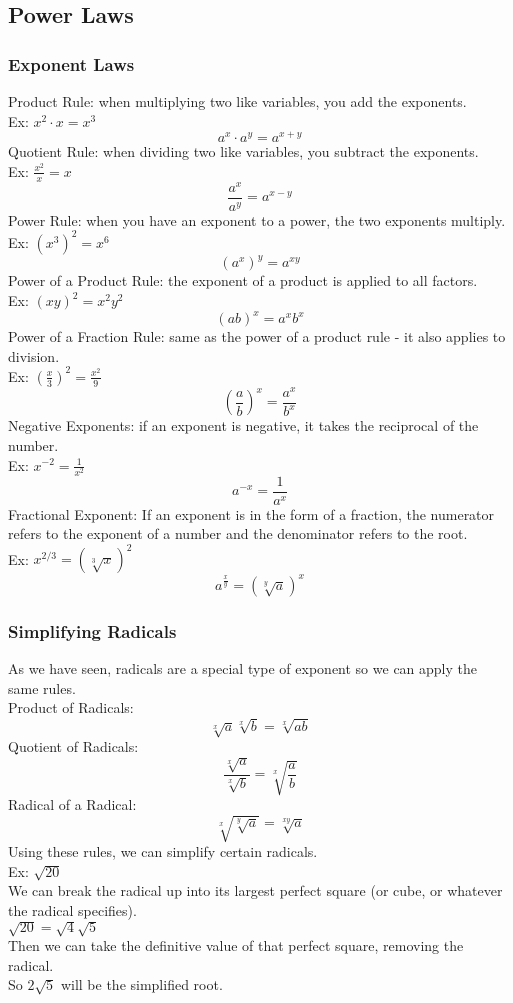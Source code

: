 \subsection{Power Laws}

\subsubsection{Exponent Laws}
Product Rule: when multiplying two like variables, you add the exponents.\\ Ex: $x^2\cdot x=x^3$
$$a^x\cdot a^y=a^{x+y}$$
Quotient Rule: when dividing two like variables, you subtract the exponents.\\
Ex: $\frac{x^2}{x}=x$
$$\frac{a^x}{a^y}=a^{x-y}$$
Power Rule: when you have an exponent to a power, the two exponents multiply.\\
Ex: $(x^3)^2=x^6$
$$(a^x)^y=a^{xy}$$
Power of a Product Rule: the exponent of a product is applied to all factors.\\
Ex: $(xy)^2=x^2y^2$
$$(ab)^x=a^xb^x$$
Power of a Fraction Rule: same as the power of a product rule - it also applies to division.\\
Ex: $\left(\frac{x}{3}\right)^2=\frac{x^2}{9}$
$$\left(\frac{a}{b}\right)^x=\frac{a^x}{b^x}$$
Negative Exponents: if an exponent is negative, it takes the reciprocal of the number.\\
Ex: $x^{-2}=\frac{1}{x^2}$
$$a^{-x}=\frac{1}{a^x}$$
Fractional Exponent: If an exponent is in the form of a fraction, the numerator refers to the exponent of a number and the denominator refers to the root.\\
Ex: $x^{2/3}=(\sqrt[3]{x})^2$
$$a^{\frac{x}{y}}=\left(\sqrt[y]{a}\right)^x$$

\subsubsection{Simplifying Radicals}
As we have seen, radicals are a special type of exponent so we can apply the same rules.\\
Product of Radicals:
$$\sqrt[x]{a}\sqrt[x]{b}=\sqrt[x]{ab}$$
Quotient of Radicals:
$$\frac{\sqrt[x]{a}}{\sqrt[x]{b}}=\sqrt[x]{\frac{a}{b}}$$
Radical of a Radical:
$$\sqrt[x]{\sqrt[y]{a}}=\sqrt[xy]{a}$$
Using these rules, we can simplify certain radicals.\\
Ex: $\sqrt{20}$\\
We can break the radical up into its largest perfect square (or cube, or whatever the radical specifies).\\
$\sqrt{20}=\sqrt{4}\sqrt{5}$\\
Then we can take the definitive value of that perfect square, removing the radical.\\
So $2\sqrt{5}$ will be the simplified root.

